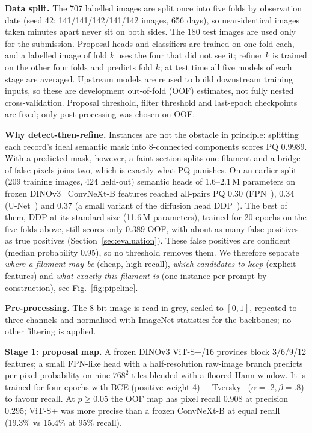 \documentclass[sigconf]{acmart}
\begin{document}
\textbf{Data split.} The 707 labelled images are split once into five folds by observation date (seed 42;
141/141/142/141/142 images, 656 days), so near-identical images taken minutes apart never sit on both sides. The
180 test images are used only for the submission. Proposal heads and classifiers are trained on one fold each, and a
labelled image of fold $k$ uses the four that did not see it; refiner $k$ is trained on the other four folds and
predicts fold $k$; at test time all five models of each stage are averaged. Upstream models are reused to build
downstream training inputs, so these are development out-of-fold (OOF) estimates, not fully nested cross-validation.
Proposal threshold, filter threshold and last-epoch checkpoints are fixed; only post-processing was chosen on OOF.

\textbf{Why detect-then-refine.} Instances are not the obstacle in principle: splitting each record's ideal
semantic mask into 8-connected components scores PQ 0.9989. With a predicted mask, however, a faint section splits
one filament and a bridge of false pixels joins two, which is exactly what PQ punishes. On an earlier split (209
training images, 424 held-out) semantic heads of 1.6--2.1\,M parameters on frozen DINOv3~\cite{dinov3} ConvNeXt-B
features reached all-pairs PQ 0.30 (FPN~\cite{fpn}), 0.34 (U-Net~\cite{unet}) and 0.37 (a small variant of the
diffusion head DDP~\cite{ddp}). The best of them, DDP at its standard size (11.6\,M parameters), trained for 20 epochs
on the five folds above, still scores only 0.389 OOF, with about as many false positives as true positives
(Section~\ref{sec:evaluation}). These false positives are confident (median probability 0.95), so no threshold removes
them. We therefore separate \emph{where a filament may be} (cheap, high recall), \emph{which candidates to keep}
(explicit features) and \emph{what exactly this filament is} (one instance per prompt by construction), see
Fig.~\ref{fig:pipeline}.

\textbf{Pre-processing.} The 8-bit image is read in grey, scaled to $[0,1]$, repeated to three channels and normalised
with ImageNet statistics for the backbones; no other filtering is applied.

\textbf{Stage 1: proposal map.} A frozen DINOv3 ViT-S+/16 provides block 3/6/9/12 features; a small FPN-like head with
a half-resolution raw-image branch predicts per-pixel probability on nine $768^2$ tiles blended with a floored Hann
window. It is trained for four epochs with BCE (positive weight 4) + Tversky~\cite{tversky} ($\alpha{=}.2,\beta{=}.8$)
to favour recall. At $p\ge0.05$ the OOF map has pixel recall 0.908 at precision 0.295; ViT-S+ was more precise than a
frozen ConvNeXt-B at equal recall (19.3\% vs 15.4\% at 95\% recall).
\end{document}

